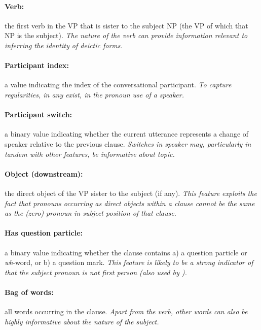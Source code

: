 \documentclass[11pt]{report}
\renewcommand\cite{\citep}	%
\begin{document}
\paragraph{Verb:} the first verb in the VP that is sister to the subject NP (the VP of which that NP is the subject).   \emph{The nature of the verb can provide information relevant to inferring the identity of  deictic forms.}
\vspace{-0.5em}

\paragraph{Participant index:} a value indicating the index of the conversational participant.   \emph{To capture regularities, in any exist, in the pronoun use of a speaker.}
\vspace{-0.5em}

\paragraph{Participant switch:} a binary value indicating whether the current utterance represents a change of speaker relative to the previous clause.   \emph{Switches in speaker may, particularly in tandem with other features, be informative about topic.}
\vspace{-0.5em}

\paragraph{Object (downstream):} the direct object of the VP sister to the subject (if any).   \emph{This feature exploits the fact that pronouns occurring as direct objects within a clause cannot be the same as the (zero) pronoun in subject position of that clause.}
\vspace{-0.5em}

\paragraph{Has question particle:} a binary value indicating whether the clause contains a) a question particle or \emph{wh}-word, or b) a question mark.   \emph{This feature is likely to be a strong indicator of that the subject pronoun is \emph{not} first person (also used by \cite{chen2013chinese}).}
\vspace{-0.5em}

\paragraph{Bag of words:} all words occurring in the clause.   \emph{Apart from the verb, other words can also be highly informative about the nature of the subject.}
\vspace{-0.5em}
\end{document}
